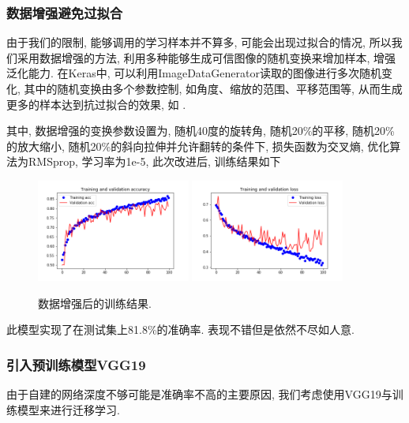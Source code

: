\documentclass[lang=cn,11pt]{elegantpaper}
\begin{document}
\subsubsection{数据增强避免过拟合}

由于我们的限制, 能够调用的学习样本并不算多, 可能会出现过拟合的情况, 所以我们采用数据增强的方法, 利用多种能够生成可信图像的随机变换来增加样本, 增强泛化能力.  在Keras中, 可以利用ImageDataGenerator读取的图像进行多次随机变化, 其中的随机变换由多个参数控制, 如角度、缩放的范围、平移范围等, 从而生成更多的样本达到抗过拟合的效果, 如 .

其中, 数据增强的变换参数设置为, 随机40度的旋转角, 随机20\%的平移, 随机20\%的放大缩小, 随机20\%的斜向拉伸并允许翻转的条件下, 损失函数为交叉熵, 优化算法为RMSprop, 学习率为1e-5, 此次改进后, 训练结果如下
\begin{figure}[htbp]
	\centering
	  \includegraphics[width=0.45\textwidth]{small_aug_1.png}
	  \includegraphics[width=0.45\textwidth]{small_aug_2.png}
	  \caption{数据增强后的训练结果.}
	\end{figure}

此模型实现了在测试集上81.8\%的准确率. 表现不错但是依然不尽如人意.

\subsubsection{引入预训练模型VGG19}
由于自建的网络深度不够可能是准确率不高的主要原因, 我们考虑使用VGG19与训练模型来进行迁移学习. 
\end{document}
